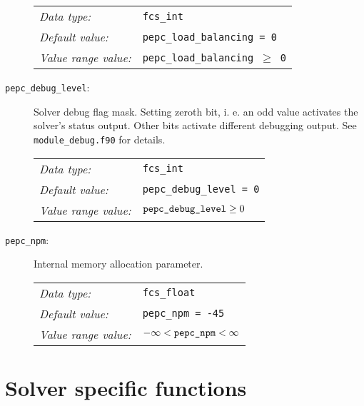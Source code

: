 \begin{description}
	\begin{tabular}{ll}
	   \textit{Data type:}         & \texttt{fcs\_int} \\
	   \textit{Default value:}     & \texttt{pepc\_load\_balancing = 0} \\
	   \textit{Value range value:} & \texttt{pepc\_load\_balancing $\geq$ 0}
	\end{tabular}

  \item[\texttt{pepc\_debug\_level}:] Solver debug flag mask. Setting zeroth bit, i. e. an odd value activates the solver's status output. Other bits activate different debugging output. See \texttt{module\_debug.f90} for details.

	\begin{tabular}{ll}
	   \textit{Data type:}         & \texttt{fcs\_int} \\
	   \textit{Default value:}     & \texttt{pepc\_debug\_level = 0} \\
	   \textit{Value range value:} & \texttt{$\text{\texttt{pepc\_debug\_level}} \geq 0$}
	\end{tabular}

  \item[\texttt{pepc\_npm}:] Internal memory allocation parameter.

	\begin{tabular}{ll}
	   \textit{Data type:}         & \texttt{fcs\_float} \\
	   \textit{Default value:}     & \texttt{pepc\_npm = -45} \\
	   \textit{Value range value:} & \texttt{$-\infty < \text{\texttt{pepc\_npm}} < \infty$}
	\end{tabular}

\end{description}


\section*{Solver specific functions}


